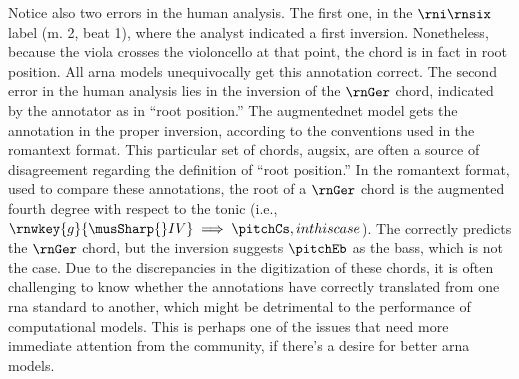 Notice also two errors in the human analysis. The first one,
in the $\rni\rnsix$ label (m. 2, beat 1), where the analyst
indicated a first inversion. Nonetheless, because the viola
crosses the violoncello at that point, the chord is in fact
in root position. All \gls{arna} models unequivocally get
this annotation correct. The second error in the human
analysis lies in the inversion of the $\rnGer$ chord,
indicated by the annotator as in ``root position.'' The
\gls{augmentednet} model gets the annotation in the proper
inversion, according to the conventions used in the
\gls{romantext} format. This particular set of chords,
\gls{augsix}, are often a source of disagreement regarding
the definition of ``root position.'' In the \gls{romantext}
format, used to compare these annotations, the root of a
$\rnGer$ chord is the augmented fourth degree with respect
to the tonic (i.e., $\rnwkey{g}{\musSharp{}IV} \implies
\pitchCs, in this case$). The \textcite{micchi2021deep}
correctly predicts the $\rnGer$ chord, but the inversion
suggests $\pitchEb$ as the bass, which is not the case. Due
to the discrepancies in the digitization of these chords, it
is often challenging to know whether the annotations have
correctly translated from one \gls{rna} standard to another,
which might be detrimental to the performance of
computational models. This is perhaps one of the issues that
need more immediate attention from the community, if there's
a desire for better \gls{arna} models.